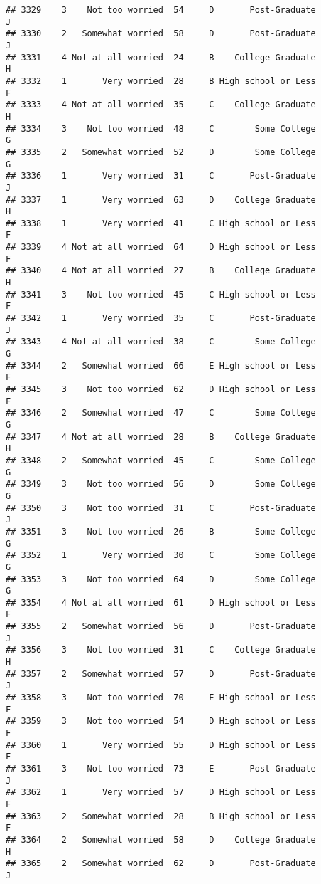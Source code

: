 \documentclass[
]{article}
\begin{document}
\begin{verbatim}
## 3329    3    Not too worried  54     D       Post-Graduate         J
## 3330    2   Somewhat worried  58     D       Post-Graduate         J
## 3331    4 Not at all worried  24     B    College Graduate         H
## 3332    1       Very worried  28     B High school or Less         F
## 3333    4 Not at all worried  35     C    College Graduate         H
## 3334    3    Not too worried  48     C        Some College         G
## 3335    2   Somewhat worried  52     D        Some College         G
## 3336    1       Very worried  31     C       Post-Graduate         J
## 3337    1       Very worried  63     D    College Graduate         H
## 3338    1       Very worried  41     C High school or Less         F
## 3339    4 Not at all worried  64     D High school or Less         F
## 3340    4 Not at all worried  27     B    College Graduate         H
## 3341    3    Not too worried  45     C High school or Less         F
## 3342    1       Very worried  35     C       Post-Graduate         J
## 3343    4 Not at all worried  38     C        Some College         G
## 3344    2   Somewhat worried  66     E High school or Less         F
## 3345    3    Not too worried  62     D High school or Less         F
## 3346    2   Somewhat worried  47     C        Some College         G
## 3347    4 Not at all worried  28     B    College Graduate         H
## 3348    2   Somewhat worried  45     C        Some College         G
## 3349    3    Not too worried  56     D        Some College         G
## 3350    3    Not too worried  31     C       Post-Graduate         J
## 3351    3    Not too worried  26     B        Some College         G
## 3352    1       Very worried  30     C        Some College         G
## 3353    3    Not too worried  64     D        Some College         G
## 3354    4 Not at all worried  61     D High school or Less         F
## 3355    2   Somewhat worried  56     D       Post-Graduate         J
## 3356    3    Not too worried  31     C    College Graduate         H
## 3357    2   Somewhat worried  57     D       Post-Graduate         J
## 3358    3    Not too worried  70     E High school or Less         F
## 3359    3    Not too worried  54     D High school or Less         F
## 3360    1       Very worried  55     D High school or Less         F
## 3361    3    Not too worried  73     E       Post-Graduate         J
## 3362    1       Very worried  57     D High school or Less         F
## 3363    2   Somewhat worried  28     B High school or Less         F
## 3364    2   Somewhat worried  58     D    College Graduate         H
## 3365    2   Somewhat worried  62     D       Post-Graduate         J

\end{verbatim}
\end{document}
